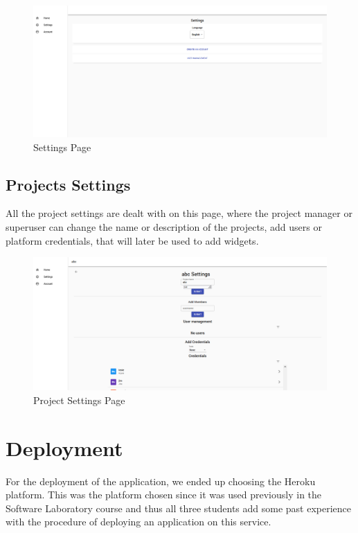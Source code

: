 \documentclass[a4paper,twoside,10pt]{report}
\begin{document}
\begin{figure}[h!]
\center
    \includegraphics[width=\textwidth]{settingsPage.png}
\caption{Settings Page}
\end{figure}

\section{Projects Settings}
All the project settings are dealt with on this page, where the project manager or superuser can change the name or description of the projects, add users or platform credentials, that will later be used to add widgets.

\begin{figure}[h!]
\center
    \includegraphics[width=\textwidth]{projectsettingsPage.png}
\caption{Project Settings Page}
\end{figure}

\chapter{Deployment}
For the deployment of the application, we ended up choosing the Heroku\cite{HEROKU} platform. This was the platform chosen since it was used previously in the Software Laboratory course and thus all three students add some past experience with the procedure of deploying an application on this service.
\end{document}
